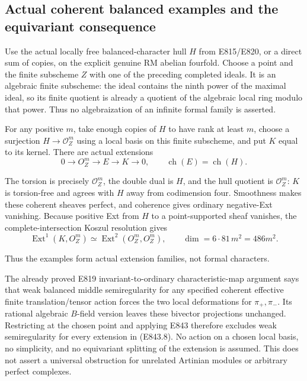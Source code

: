 \subsection{Actual coherent balanced examples and the equivariant consequence}
\label{SF-E843:sheaves}

Use the actual locally free balanced-character hull \(H\) from E815/E820,
or a direct sum of copies, on the explicit genuine RM abelian fourfold.
Choose a point and the finite subscheme \(Z\) with one of the preceding
completed ideals. It is an algebraic finite subscheme: the ideal contains
the ninth power of the maximal ideal, so its finite quotient is already
a quotient of the algebraic local ring modulo that power.
Thus no algebraization of an infinite formal family is asserted.

For any positive \(m\), take enough copies of \(H\) to have rank at least
\(m\), choose a surjection \(H\to\mathcal O_Z^m\) using a local basis
on this finite subscheme, and put \(K\) equal to its kernel.
There are actual extensions
\[
 0\longrightarrow O_Z^m\longrightarrow E\longrightarrow K\longrightarrow0,
 \qquad
                \operatorname{ch}(E)=\operatorname{ch}(H).
 \tag{E843.8}
\]

The torsion is precisely \(\mathcal O_Z^m\), the double dual is \(H\),
and the hull quotient is \(\mathcal O_Z^m\): \(K\) is torsion-free and
agrees with \(H\) away from codimension four.
Smoothness makes these coherent sheaves perfect, and coherence gives
ordinary negative-Ext vanishing.
Because positive Ext from \(H\) to a point-supported sheaf vanishes,
the complete-intersection Koszul resolution gives
\[
 \operatorname{Ext}^1(K,O_Z^m)\simeq
 \operatorname{Ext}^2(O_Z^m,O_Z^m),\qquad
                         \dim=6\cdot81\,m^2=486m^2.
 \tag{E843.9}
\]

Thus the examples form actual extension families, not formal characters.

The already proved E819 invariant-to-ordinary characteristic-map argument
says that weak balanced middle semiregularity for any specified coherent
effective finite translation/tensor action forces the two local
deformations for \(\pi_+,\pi_-\).
Its rational algebraic \(B\)-field version leaves these bivector projections
unchanged. Restricting at the chosen point and applying E843 therefore
excludes weak semiregularity for every extension in (E843.8).
No action on a chosen local basis, no simplicity, and no equivariant
splitting of the extension is assumed.
This does not assert a universal obstruction for unrelated Artinian modules
or arbitrary perfect complexes.

